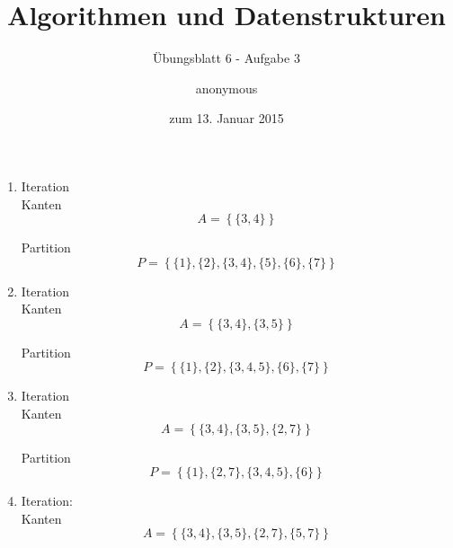 \documentclass[a4paper]{scrartcl}
\title{Algorithmen und Datenstrukturen}
\subtitle{Übungsblatt 6 - Aufgabe 3}
\author{
    anonymous
}
\date{zum 13. Januar 2015}
\begin{document}
\maketitle

\begin{enumerate}
    \item Iteration \\
        Kanten
        \begin{equation}
            A = \left\{
                \{ 3,4 \}
            \right\}
        \end{equation}
        
        Partition
        \begin{equation}
            P = \left\{
                \{ 1 \},
                \{ 2 \},
                \{ 3,4 \},
                \{ 5 \},
                \{ 6 \},
                \{ 7 \}
            \right\}
        \end{equation}
        
    \item Iteration \\
        Kanten
        \begin{equation}
            A = \left\{
                \{ 3,4 \},
                \{ 3,5 \}
            \right\}
        \end{equation}
        
        Partition
        \begin{equation}
            P = \left\{
                \{ 1 \},
                \{ 2 \},
                \{ 3, 4, 5 \},
                \{ 6 \},
                \{ 7 \}
            \right\}
        \end{equation}
        
    \item Iteration \\
        Kanten
        \begin{equation}
            A = \left\{
                \{ 3,4 \},
                \{ 3,5 \},
                \{ 2,7 \}
            \right\}
        \end{equation}
        
        Partition
        \begin{equation}
            P = \left\{
                \{ 1 \},
                \{ 2, 7 \},
                \{ 3, 4, 5 \},
                \{ 6 \}
            \right\}
        \end{equation}
        
    \item Iteration:\\
        Kanten
        \begin{equation}
            A = \left\{
                \{ 3,4 \},
                \{ 3,5 \},
                \{ 2,7 \},
                \{ 5,7 \}
            \right\}
        \end{equation}
        

\end{enumerate}
\end{document}
